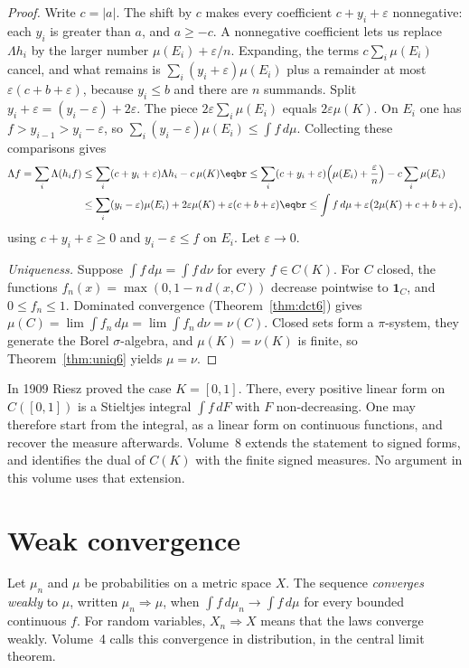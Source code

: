 \begin{proof}
Write $c=|a|$. The shift by $c$ makes every coefficient $c+y_i+\varepsilon$ nonnegative: each $y_i$ is greater than $a$, and $a\ge -c$. A
nonnegative coefficient lets us replace $\Lambda h_i$ by the larger number $\mu(E_i)+\varepsilon/n$. Expanding, the terms $c\sum_i\mu(E_i)$ cancel,
and what remains is $\sum_i(y_i+\varepsilon)\mu(E_i)$ plus a remainder at most $\varepsilon(c+b+\varepsilon)$, because $y_i\le b$ and there are $n$ summands.
Split $y_i+\varepsilon=(y_i-\varepsilon)+2\varepsilon$. The piece $2\varepsilon\sum_i\mu(E_i)$ equals $2\varepsilon\mu(K)$. On $E_i$ one has $f>y_{i-1}>y_i-\varepsilon$, so
$\sum_i(y_i-\varepsilon)\mu(E_i)\le\int f\,d\mu$. Collecting these comparisons gives
\[\begin{aligned}\Lambda f=\sum_i\Lambda(h_if)&\le\sum_i(c+y_i+\varepsilon)\Lambda h_i-c\,\mu(K)\eqbr\le\sum_i(c+y_i+\varepsilon)\Bigl(\mu(E_i)+\frac\varepsilon n\Bigr)-c\sum_i\mu(E_i)\\&\le\sum_i(y_i-\varepsilon)\mu(E_i)+2\varepsilon\mu(K)+\varepsilon(c+b+\varepsilon)\eqbr\le\int f\,d\mu+\varepsilon\bigl(2\mu(K)+c+b+\varepsilon\bigr),\end{aligned}\]
using $c+y_i+\varepsilon\ge 0$ and $y_i-\varepsilon\le f$ on $E_i$. Let $\varepsilon\to 0$.

\emph{Uniqueness.} Suppose $\int f\,d\mu=\int f\,d\nu$ for every $f\in C(K)$. For $C$ closed, the functions
$f_n(x)=\max(0,1-n\,d(x,C))$ decrease pointwise to $\mathbf 1_C$, and $0\le f_n\le 1$. Dominated convergence (Theorem~\ref{thm:dct6}) gives
$\mu(C)=\lim\int f_n\,d\mu=\lim\int f_n\,d\nu=\nu(C)$. Closed sets form a $\pi$-system, they generate the Borel $\sigma$-algebra, and
$\mu(K)=\nu(K)$ is finite, so Theorem~\ref{thm:uniq6} yields $\mu=\nu$.
\end{proof}

In 1909 Riesz proved the case $K=[0,1]$. There, every positive linear form on $C([0,1])$ is a Stieltjes integral $\int f\,dF$ with $F$
non-decreasing. One may therefore start from the integral, as a linear form on continuous functions, and recover the measure afterwards.
Volume~8 extends the statement to signed forms, and identifies the dual of $C(K)$ with the finite signed measures. No argument in this
volume uses that extension.

\section{Weak convergence}

Let $\mu_n$ and $\mu$ be probabilities on a metric space $X$. The sequence \emph{converges weakly} to $\mu$, written $\mu_n\Rightarrow\mu$, when
$\int f\,d\mu_n\to\int f\,d\mu$ for every bounded continuous $f$. For random variables, $X_n\Rightarrow X$ means that the laws converge weakly.
Volume~4 calls this convergence in distribution, in the central limit theorem.

